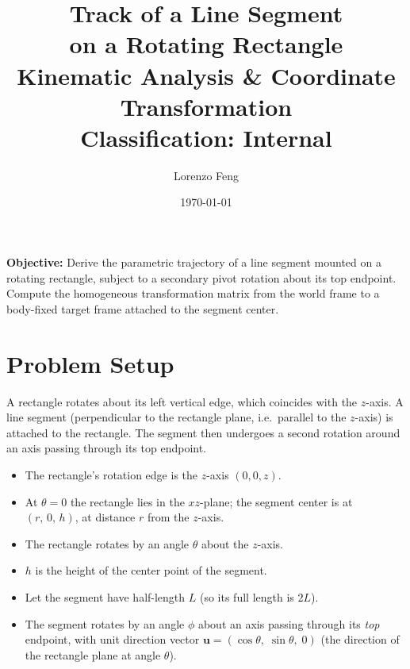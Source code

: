 \documentclass[12pt,a4paper]{article}
\title{\Huge\textbf{Track of a Line Segment}\\[4pt]
       \Huge\textbf{on a Rotating Rectangle}\\[12pt]
       \large Kinematic Analysis \& Coordinate Transformation\\[8pt]
       \normalsize Classification: Internal}
\author{Lorenzo Feng}
\date{\today}
\begin{document}
\maketitle

\vspace{1.5cm}

\begin{center}
\begin{minipage}{0.75\textwidth}
\large
\textbf{Objective:} Derive the parametric trajectory of a line segment
mounted on a rotating rectangle, subject to a secondary pivot rotation
about its top endpoint. Compute the homogeneous transformation matrix
from the world frame to a body-fixed target frame attached to the
segment center.
\end{minipage}
\end{center}

\vfill

\clearpage
\tableofcontents
\clearpage

\section{Problem Setup}

A rectangle rotates about its left vertical edge, which coincides with the $z$-axis.
A line segment (perpendicular to the rectangle plane, i.e.\ parallel to the $z$-axis)
is attached to the rectangle. The segment then undergoes a second rotation
around an axis passing through its top endpoint.

\begin{itemize}[leftmargin=*]
  \item The rectangle's rotation edge is the $z$-axis $(0,0,z)$.
  \item At $\theta=0$ the rectangle lies in the $xz$-plane; the segment center
    is at $(r,\,0,\,h)$, at distance $r$ from the $z$-axis.
  \item The rectangle rotates by an angle $\theta$ about the $z$-axis.
  \item $h$ is the height of the center point of the segment.
  \item Let the segment have half-length $L$ (so its full length is $2L$).
  \item The segment rotates by an angle $\phi$ about an axis passing through
    its \emph{top} endpoint, with unit direction vector
    $\mathbf{u} = (\cos\theta,\; \sin\theta,\; 0)$
    (the direction of the rectangle plane at angle $\theta$).
\end{itemize}
\end{document}
